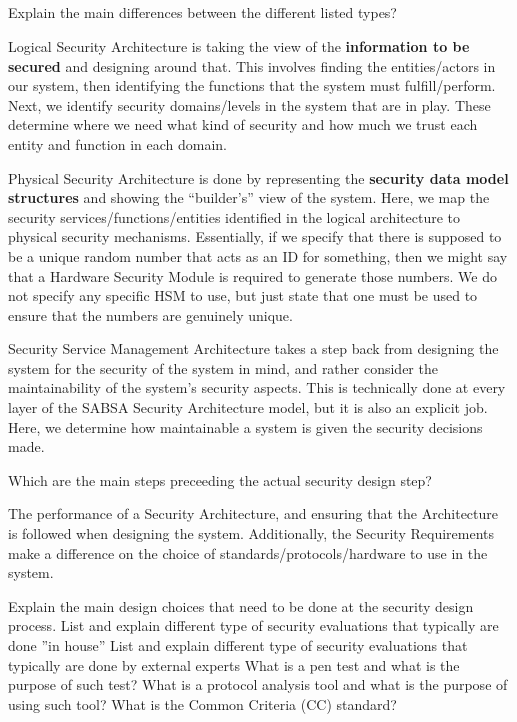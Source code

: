 \begin{questions}
  \begin{parts}
  \part{} Explain the main differences between the different listed types?
    \begin{solution}
      Logical Security Architecture is taking the view of the \textbf{information to be secured} and designing around that.
      This involves finding the entities/actors in our system, then identifying the functions that the system must fulfill/perform.
      Next, we identify security domains/levels in the system that are in play.
      These determine where we need what kind of security and how much we trust each entity and function in each domain.

      Physical Security Architecture is done by representing the \textbf{security data model structures} and showing the ``builder's'' view of the system.
      Here, we map the security services/functions/entities identified in the logical architecture to physical security mechanisms.
      Essentially, if we specify that there is supposed to be a unique random number that acts as an ID for something, then we might say that a Hardware Security Module is required to generate those numbers.
      We do not specify any specific HSM to use, but just state that one must be used to ensure that the numbers are genuinely unique.

      Security Service Management Architecture takes a step back from designing the system for the security of the system in mind, and rather consider the maintainability of the system's security aspects.
      This is technically done at every layer of the SABSA Security Architecture model, but it is also an explicit job.
      Here, we determine how maintainable a system is given the security decisions made.
    \end{solution}
  \end{parts}

\question{} Which are the main steps preceeding the actual security design step?
  \begin{solution}
    The performance of a Security Architecture, and ensuring that the Architecture is followed when designing the system.
    Additionally, the Security Requirements make a difference on the choice of standards/protocols/hardware to use in the system.
  \end{solution}

\question{} Explain the main design choices that need to be done at the security design process.
\question{} List and explain different type of security evaluations that typically are done ”in house”
\question{} List and explain different type of security evaluations that typically are done by external experts
\question{} What is a pen test and what is the purpose of such test?
\question{} What is a protocol analysis tool and what is the purpose of using such tool?
\question{} What is the Common Criteria (CC) standard?
  \begin{parts}

\end{parts}
\end{questions}
